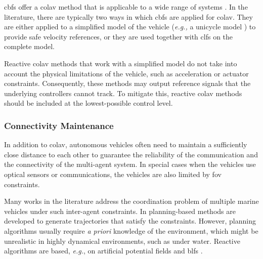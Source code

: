 \Glspl{cbf} offer a \gls{colav} method that is applicable to a wide range of systems \cite{ames_control_2019}.
In the literature, there are typically two ways in which \glspl{cbf} are applied for \gls{colav}.
They are either applied to a simplified model of the vehicle (\emph{e.g.,} a unicycle model \cite{squires_constructive_2018,igarashi_collision_2018}) to provide safe velocity references, or they are used together with \glspl{clf} \cite{romdlony_stabilization_2016,basso_safety-critical_2020,ames_control_2014} on the complete model.

Reactive \gls{colav} methods that work with a simplified model do not take into account the physical limitations of the vehicle, such as acceleration or actuator constraints.
Consequently, these methods may output reference signals that the underlying controllers cannot track.
To mitigate this, reactive \gls{colav} methods should be included at the lowest-possible control level.

\subsubsection{Connectivity Maintenance}
In addition to \gls{colav}, autonomous vehicles often need to maintain a sufficiently close distance to each other to guarantee the reliability of the communication and the connectivity of the multi-agent system.
In special cases when the vehicles use optical sensors or communications, the vehicles are also limited by \gls{fov} constraints.

Many works in the literature address the coordination problem of multiple marine vehicles under such inter-agent constraints. In \cite{gan2014online,gomes2018MPC} planning-based methods are developed to generate trajectories that satisfy the constraints. However, planning algorithms usually require \emph{a priori} knowledge of the environment, which might be unrealistic in highly dynamical environments, such as under water. Reactive algorithms are based, \emph{e.g.}, on artificial potential fields \cite{jia2007formation,brinon2010contraction} and \glspl{blf} \cite{gao2019velocity-free,naderolasli2023platoon}.
